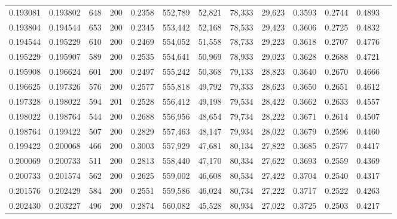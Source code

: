 \begin{tabular}{rrrrrrrrrrrrr}
0.193081 & 0.193802 &    648 & 200 &                                     0.2358 & 552,789 &  52,821 &  78,333 &  29,623 & 0.3593 & 0.2744 & 0.4893 \\
0.193804 & 0.194544 &    653 & 200 &                                     0.2345 & 553,442 &  52,168 &  78,533 &  29,423 & 0.3606 & 0.2725 & 0.4832 \\
0.194544 & 0.195229 &    610 & 200 &                                     0.2469 & 554,052 &  51,558 &  78,733 &  29,223 & 0.3618 & 0.2707 & 0.4776 \\
0.195229 & 0.195907 &    589 & 200 &                                     0.2535 & 554,641 &  50,969 &  78,933 &  29,023 & 0.3628 & 0.2688 & 0.4721 \\
0.195908 & 0.196624 &    601 & 200 &                                     0.2497 & 555,242 &  50,368 &  79,133 &  28,823 & 0.3640 & 0.2670 & 0.4666 \\
0.196625 & 0.197326 &    576 & 200 &                                     0.2577 & 555,818 &  49,792 &  79,333 &  28,623 & 0.3650 & 0.2651 & 0.4612 \\
0.197328 & 0.198022 &    594 & 201 &                                     0.2528 & 556,412 &  49,198 &  79,534 &  28,422 & 0.3662 & 0.2633 & 0.4557 \\
0.198022 & 0.198764 &    544 & 200 &                                     0.2688 & 556,956 &  48,654 &  79,734 &  28,222 & 0.3671 & 0.2614 & 0.4507 \\
0.198764 & 0.199422 &    507 & 200 &                                     0.2829 & 557,463 &  48,147 &  79,934 &  28,022 & 0.3679 & 0.2596 & 0.4460 \\
0.199422 & 0.200068 &    466 & 200 &                                     0.3003 & 557,929 &  47,681 &  80,134 &  27,822 & 0.3685 & 0.2577 & 0.4417 \\
0.200069 & 0.200733 &    511 & 200 &                                     0.2813 & 558,440 &  47,170 &  80,334 &  27,622 & 0.3693 & 0.2559 & 0.4369 \\
0.200733 & 0.201574 &    562 & 200 &                                     0.2625 & 559,002 &  46,608 &  80,534 &  27,422 & 0.3704 & 0.2540 & 0.4317 \\
0.201576 & 0.202429 &    584 & 200 &                                     0.2551 & 559,586 &  46,024 &  80,734 &  27,222 & 0.3717 & 0.2522 & 0.4263 \\
0.202430 & 0.203227 &    496 & 200 &                                     0.2874 & 560,082 &  45,528 &  80,934 &  27,022 & 0.3725 & 0.2503 & 0.4217 \\

\end{tabular}
